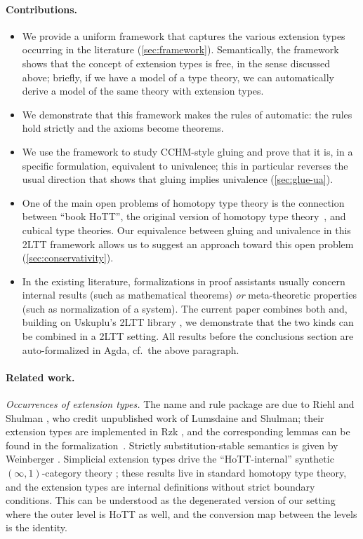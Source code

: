\paragraph{Contributions.}
\begin{itemize}[noitemsep]
	\item We provide a uniform framework that captures the
	various extension types occurring in the literature (\cref{sec:framework}).
	Semantically, the framework shows that the concept of extension types
	is free, in the sense discussed above; briefly, if we have a model of a type theory, we can automatically derive a model of the same theory with extension types.
	\item We demonstrate that this framework makes the rules of \citet{RS2017}
	automatic: the rules hold strictly and the axioms become theorems.
	\item We use the framework to study CCHM-style gluing and prove that it
	is, in a specific formulation, equivalent to univalence; this in particular
	reverses the usual direction that shows that gluing implies univalence
	(\cref{sec:glue-ua}).
	\item One of the main open problems of homotopy type theory is the connection between
	``book HoTT'', the original version of homotopy type theory~\citep{HoTTBook},
	and cubical type theories.
	Our equivalence between gluing and univalence in this 2LTT framework
	allows us to suggest an approach 
	toward this open problem (\cref{sec:conservativity}).
	\item In the existing literature, formalizations in proof assistants usually concern internal results (such as mathematical theorems) \emph{or} meta-theoretic properties (such as normalization of a system).
	The current paper combines both and, building on Uskuplu's 2LTT library \citep{Uskuplu2025}, we demonstrate that the two kinds can be combined in a 2LTT setting.
	All results before the conclusions section are auto-formalized in Agda, cf.\ the above paragraph.
\end{itemize}

\paragraph{Related work.}
\emph{Occurrences of extension types.}
The name and rule package are due to Riehl and Shulman \citep[\S2.2]{RS2017},
who credit unpublished work of Lumsdaine and Shulman; their extension types
are implemented in Rzk \citep{rzk,KRW2024}, and the corresponding lemmas can be found in the formalization~\cite{sHoTT}.
%
Strictly substitution-stable semantics is given by Weinberger \citep{Wei2022}.
Simplicial extension types drive
the ``HoTT-internal'' synthetic $(\infty,1)$-category theory \citep{WB2023,GWB2024,GWB2025,GWB2026,Toth2025};
these results live in standard homotopy type theory, and the extension types are internal definitions without strict boundary conditions. This can be understood as the degenerated version of our setting where the outer level is HoTT as well, and the conversion map between the levels is the identity.

